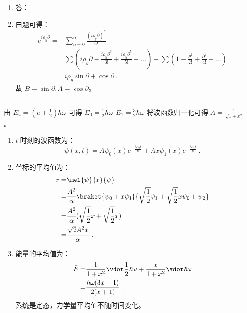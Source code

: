 \begin{enumerate}
\item 答：%
\item 由题可得：
\begin{equation}
\begin{aligned}
e^{i \rho_{y} \partial} =& \sum_{n=0}^{\infty} \frac{(i \rho_y \partial)^{n}}{n!} \\
=& \sum (i\rho_y \partial - \frac{i\rho_y \partial^3}{3!} + \frac{i\rho_y \partial^5}{5!} + \dots) + \sum (1 - \frac{\partial^2}{2!} + \frac{\partial^4}{4!} + \dots) \\
=& i\rho_y \sin{\partial} + \cos{\partial} ~.
\end{aligned}
\end{equation}
故 $B=\sin{\partial},A=\cos{\partial}$。
\end{enumerate}
\subsection{ }
由 $E_n = (n+\frac{1}{2})\hbar \omega$ 可得 $E_0 = \frac{1}{2}\hbar \omega ,E_1 = \frac{3}{2}\hbar \omega$ 将波函数归一化可得 $A=\frac{1}{\sqrt{1+x^2}}$。
\begin{enumerate}
\item $t$ 时刻的波函数为：
\begin{equation}
\psi(x,t)=A\psi_{0}(x)e^{-\frac{iE_{0}t}{\hbar}} + Ax\psi_{1}(x)e^{-\frac{iE_{1}t}{\hbar}}~.
\end{equation}
\item 坐标的平均值为：
\begin{equation}
\begin{aligned}
\bar{x} =& \mel{\psi}{x}{\psi} \\
=& \frac{A^{2}}{\alpha} \braket{\psi_{0} + x\psi_{1}}{\sqrt{\frac{1}{2}}\psi_{1} +\sqrt{\frac{1}{2}}x\psi_{0} + \psi_{2} } \\
=& \frac{A^{2}}{\alpha} (\sqrt{\frac{1}{2}}x + \sqrt{\frac{1}{2}}x) \\
=& \frac{\sqrt{2}A^{2}x}{\alpha}~.
\end{aligned}
\end{equation}
\item 能量的平均值为：
\begin{equation}
\begin{aligned}
\bar{E} =& \frac{1}{1+x^2}\vdot \frac{1}{2}\hbar \omega + \frac{x}{1+x^2}\vdot \hbar \omega \\
=& \frac{\hbar \omega (3x+1)}{2(x+1)}~.
\end{aligned}
\end{equation}
系统是定态，力学量平均值不随时间变化。
\end{enumerate}
